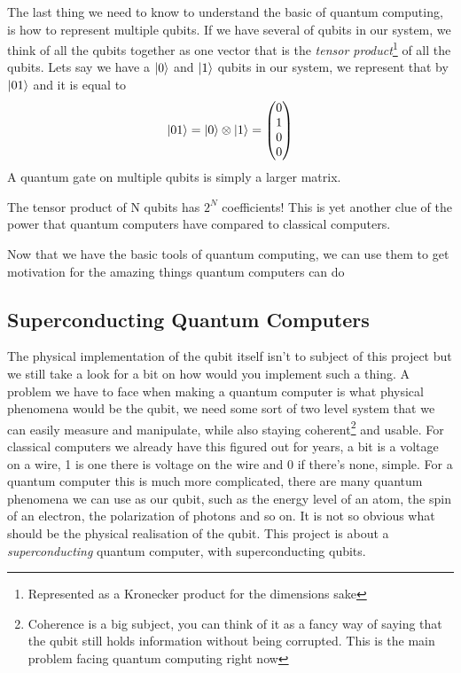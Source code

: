 \documentclass[english, a4paper, 12pt, twoside]{article}
\numberwithin{equation}{section} %
\begin{document}
The last thing we need to know to understand the basic of quantum computing, is how to represent multiple qubits. If we have several of qubits in our system, we think of all the qubits together as one vector that is the \textit{tensor product}\footnote{Represented as a Kronecker product for the dimensions sake} of all the qubits. Lets say we have a $\ket{0}$ and $\ket{1}$ qubits in our system, we represent that by $\ket{01}$ and it is equal to
\[\ket{01} = \ket{0} \otimes \ket{1} =
\begin{pmatrix}
    0 \\
    1 \\
    0 \\
    0
\end{pmatrix}\]
A quantum gate on multiple qubits is simply a larger matrix.

The tensor product of N qubits has $2^N$ coefficients! This is yet another clue of the power that quantum computers have compared to classical computers. 

Now that we have the basic tools of quantum computing, we can use them to get motivation for the amazing things quantum computers can do

\subsection{Superconducting Quantum Computers}  %
The physical implementation of the qubit itself isn't to subject of this project but we still take a look for a bit on how would you implement such a thing. A problem we have to face when making a quantum computer is what physical phenomena would be the qubit, we need some sort of two level system that we can easily measure and manipulate, while also staying coherent\footnote{Coherence is a big subject, you can think of it as a fancy way of saying that the qubit still holds information without being corrupted. This is the main problem facing quantum computing right now} and usable. For classical computers we already have this figured out for years, a bit is a voltage on a wire, 1 is one there is voltage on the wire and 0 if there's none, simple. For a quantum computer this is much more complicated, there are many quantum phenomena we can use as our qubit, such as the energy level of an atom, the spin of an electron, the polarization of photons and so on. It is not so obvious what should be the physical realisation of the qubit. This project is about a \textit{superconducting} quantum computer, with superconducting  qubits.
\end{document}
